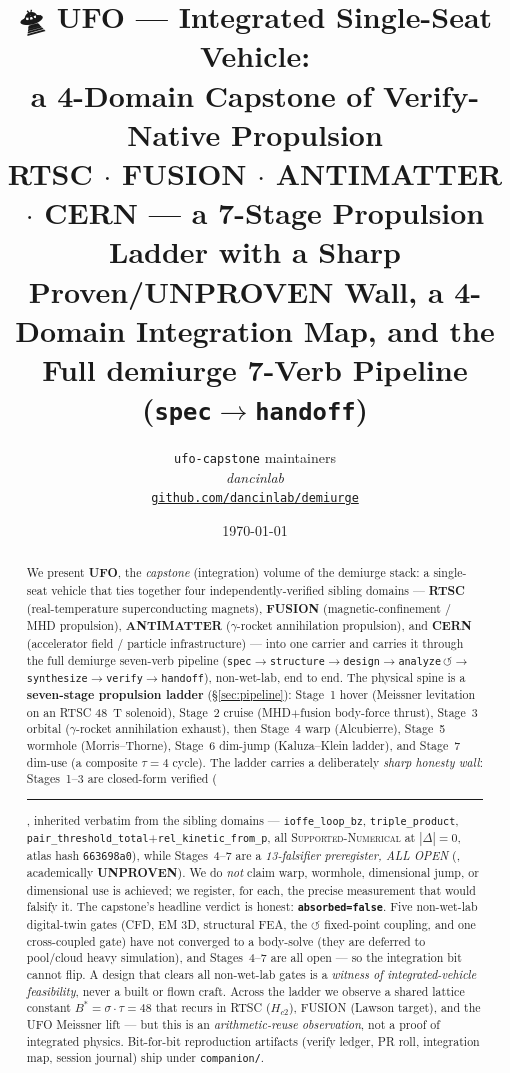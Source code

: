 \documentclass[11pt,a4paper]{article}
\title{
  \textbf{🛸 UFO --- Integrated Single-Seat Vehicle:\\
  a 4-Domain Capstone of Verify-Native Propulsion} \\[6pt]
  \large RTSC $\cdot$ FUSION $\cdot$ ANTIMATTER $\cdot$ CERN ---
  a 7-Stage Propulsion Ladder with a Sharp Proven/UNPROVEN Wall,
  a 4-Domain Integration Map, and the Full demiurge 7-Verb Pipeline
  (\texttt{spec}$\to$\texttt{handoff})
}
\author{
  \texttt{ufo-capstone} maintainers\\
  \normalsize\textit{dancinlab}\\[2pt]
  \normalsize\href{https://github.com/dancinlab/demiurge}{\texttt{github.com/dancinlab/demiurge}}
}
\date{\today}
\newcommand{\tierdisc}[1]{\textcolor{#1}{\rule[0.05ex]{1.0ex}{1.0ex}}}
\newcommand{\tierdiscopen}{\textcolor{gray!60!black}{\scalebox{0.6}{$\bigcirc$}}}
\newcommand{\tierGreen}{\tierdisc{green!60!black}}
\newcommand{\tierWhite}{\tierdiscopen}
\begin{document}
\maketitle

\begin{abstract}
We present \textbf{UFO}, the \emph{capstone} (integration) volume of the
demiurge stack: a single-seat vehicle that ties together four
independently-verified sibling domains --- \textbf{RTSC}
(real-temperature superconducting magnets), \textbf{FUSION}
(magnetic-confinement / MHD propulsion), \textbf{ANTIMATTER}
($\gamma$-rocket annihilation propulsion), and \textbf{CERN}
(accelerator field / particle infrastructure) --- into one carrier and
carries it through the full demiurge seven-verb pipeline
(\texttt{spec}$\to$\texttt{structure}$\to$\texttt{design}$\to$\texttt{analyze}\,$\circlearrowleft$$\to$\texttt{synthesize}$\to$\texttt{verify}$\to$\texttt{handoff}),
non-wet-lab, end to end. The physical spine is a \textbf{seven-stage
propulsion ladder} (\S\ref{sec:pipeline}): Stage~1 hover (Meissner
levitation on an RTSC \SI{48}{\tesla} solenoid), Stage~2 cruise
(MHD$+$fusion body-force thrust), Stage~3 orbital ($\gamma$-rocket
annihilation exhaust), then Stage~4 warp (Alcubierre), Stage~5 wormhole
(Morris--Thorne), Stage~6 dim-jump (Kaluza--Klein ladder), and Stage~7
dim-use (a composite $\tau\!=\!4$ cycle). The ladder carries a
deliberately \emph{sharp honesty wall}: Stages~1--3 are closed-form
verified (\tierGreen, inherited verbatim from the sibling domains ---
\texttt{ioffe\_loop\_bz}, \texttt{triple\_product},
\texttt{pair\_threshold\_total}$+$\texttt{rel\_kinetic\_from\_p}, all
\textsc{Supported-Numerical} at $|\Delta|\!=\!0$, atlas hash
\texttt{663698a0}), while Stages~4--7 are a \emph{13-falsifier
preregister, ALL OPEN} (\tierWhite, academically \textbf{UNPROVEN}).
We do \emph{not} claim warp, wormhole, dimensional jump, or dimensional
use is achieved; we register, for each, the precise measurement that
would falsify it. The capstone's headline verdict is honest:
\textbf{\texttt{absorbed=false}}. Five non-wet-lab digital-twin gates
(CFD, EM 3D, structural FEA, the $\circlearrowleft$ fixed-point
coupling, and one cross-coupled gate) have not converged to a body-solve
(they are deferred to pool/cloud heavy simulation), and Stages~4--7 are
all open --- so the integration bit cannot flip. A design that clears
all non-wet-lab gates is a \emph{witness of integrated-vehicle
feasibility}, never a built or flown craft. Across the ladder we
observe a shared lattice constant $B^{*}=\sigma\!\cdot\!\tau=48$ that
recurs in RTSC ($H_{c2}$), FUSION (Lawson target), and the UFO Meissner
lift --- but this is an \emph{arithmetic-reuse observation}, not a proof
of integrated physics. Bit-for-bit reproduction artifacts (verify
ledger, PR roll, integration map, session journal) ship under
\texttt{companion/}.
\end{abstract}
\end{document}
